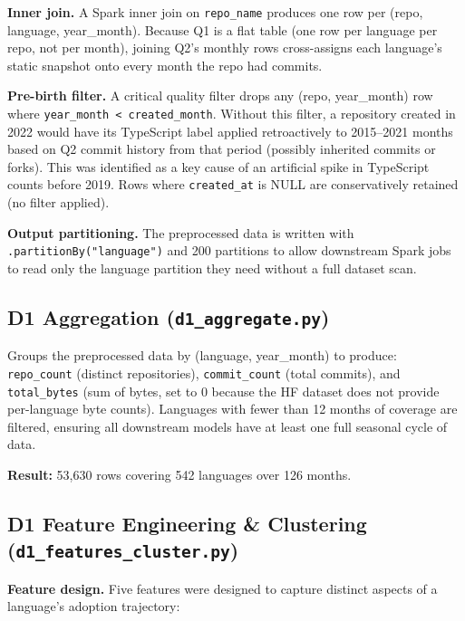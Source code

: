 \documentclass[conference]{IEEEtran}
\begin{document}
\textbf{Inner join.} A Spark inner join on \texttt{repo\_name} produces one
row per (repo, language, year\_month). Because Q1 is a flat table (one row
per language per repo, not per month), joining Q2's monthly rows cross-assigns
each language's static snapshot onto every month the repo had commits.

\textbf{Pre-birth filter.} A critical quality filter drops any
(repo, year\_month) row where \texttt{year\_month < created\_month}.
Without this filter, a repository created in 2022 would have its
TypeScript label applied retroactively to 2015--2021 months based on Q2
commit history from that period (possibly inherited commits or forks).
This was identified as a key cause of an artificial spike in TypeScript
counts before 2019. Rows where \texttt{created\_at} is NULL are conservatively
retained (no filter applied).

\textbf{Output partitioning.} The preprocessed data is written with
\texttt{.partitionBy("language")} and 200 partitions to allow downstream
Spark jobs to read only the language partition they need without a full
dataset scan.

\subsection{D1 Aggregation (\texttt{d1\_aggregate.py})}

Groups the preprocessed data by (language, year\_month) to produce:
\texttt{repo\_count} (distinct repositories), \texttt{commit\_count} (total
commits), and \texttt{total\_bytes} (sum of bytes, set to 0 because the HF
dataset does not provide per-language byte counts). Languages with fewer than
12 months of coverage are filtered, ensuring all downstream models have at
least one full seasonal cycle of data.

\textbf{Result:} 53,630 rows covering 542 languages over 126 months.

\subsection{D1 Feature Engineering \& Clustering (\texttt{d1\_features\_cluster.py})}

\textbf{Feature design.} Five features were designed to capture distinct
aspects of a language's adoption trajectory:
\end{document}
